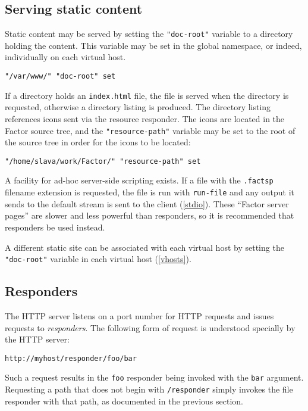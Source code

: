 \documentclass{book}
\begin{document}
\subsection{Serving static content}

Static content may be served by setting the \verb|"doc-root"| variable to a directory holding the content. This variable may be set in the global namespace, or indeed, individually on each virtual host.
\begin{verbatim}
"/var/www/" "doc-root" set
\end{verbatim}

If a directory holds an \verb|index.html| file, the file is served when the directory is requested, otherwise a directory listing is produced. The directory listing references icons sent via the resource responder. The icons are located in the Factor source tree, and the \verb|"resource-path"| variable may be set to the root of the source tree in order for the icons to be located:
\begin{verbatim}
"/home/slava/work/Factor/" "resource-path" set
\end{verbatim}
A facility for ad-hoc server-side scripting exists. If a file with the \verb|.factsp| filename extension is requested, the file is run with \verb|run-file| and any output it sends to the default stream is sent to the client (\ref{stdio}). These ``Factor server pages'' are slower and less powerful than responders, so it is recommended that responders be used instead.

A different static site can be associated with each virtual host by setting the \verb|"doc-root"| variable in each virtual host (\ref{vhosts}).

\subsection{Responders}


The HTTP server listens on a port number for HTTP requests and issues requests to \emph{responders}. The following form of request is understood specially by the HTTP server:
\begin{verbatim}
http://myhost/responder/foo/bar
\end{verbatim}
Such a request results in the \verb|foo| responder being invoked with the \verb|bar| argument. Requesting a path that does not begin with \verb|/responder| simply invokes the file responder with that path, as documented in the previous section.
\end{document}

